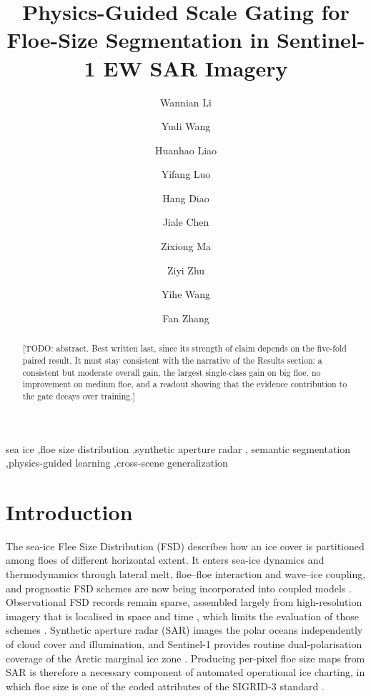 \documentclass[preprint,12pt,authoryear]{elsarticle}
\begin{document}
\begin{frontmatter}

\title{Physics-Guided Scale Gating for Floe-Size Segmentation in
Sentinel-1 EW SAR Imagery}

\author[zju]{Wannian Li}
\author[zju]{Yudi Wang}
\author[zju]{Huanhao Liao}
\author[zju]{Yifang Luo}
\author[zju]{Hang Diao}
\author[zju]{Jiale Chen}
\author[zju]{Zixiong Ma}
\author[zju]{Ziyi Zhu}
\author[zju]{Yihe Wang}
\author[zju]{Fan Zhang}


\begin{abstract}
[TODO: abstract. Best written last, since its strength of claim depends on the
five-fold paired result. It must stay consistent with the narrative of the
Results section: a consistent but moderate overall gain, the largest
single-class gain on big floe, no improvement on medium floe, and a readout
showing that the evidence contribution to the gate decays over training.]
\end{abstract}

\begin{keyword}
sea ice \sep floe size distribution \sep synthetic aperture radar \sep
semantic segmentation \sep physics-guided learning \sep cross-scene generalization
\end{keyword}

\end{frontmatter}

\section{Introduction}
\label{sec:intro}

The sea-ice Flee Size Distribution (FSD) describes how an ice cover is partitioned among floes of different horizontal extent. It enters sea-ice dynamics and thermodynamics through lateral melt, floe--floe interaction and
wave--ice coupling, and prognostic FSD schemes are now being incorporated into coupled models \citep{rothrock1984measuring,horvat2015prognostic,bateson2022floe}.
Observational FSD records remain sparse, assembled largely from high-resolution imagery that is localised in space and time \citep{toyota2006characteristics,stern2018seasonal,stern2018reconciling}, which limits the evaluation of those schemes \citep{horvat2019estimating}. Synthetic aperture radar (SAR) images the polar oceans independently of cloud cover and
illumination, and Sentinel-1 provides routine dual-polarisation coverage of the Arctic marginal ice zone \citep{torres2012sentinel1}. Producing per-pixel floe size maps from SAR is therefore a necessary component of automated operational ice charting, in which floe size is one of the coded attributes of the SIGRID-3 standard \citep{jcomm2010sigrid3,stokholm2024autoice}.
\end{document}
